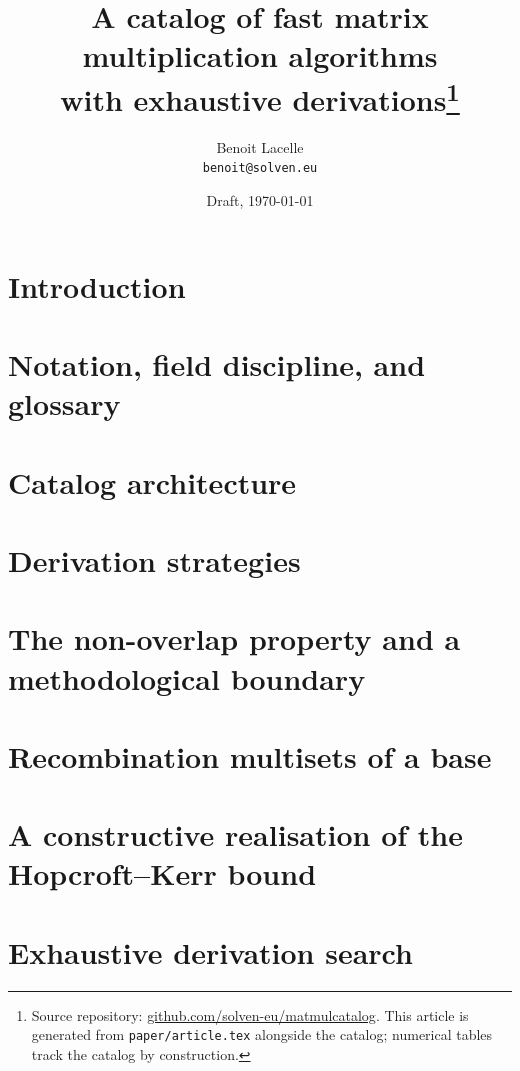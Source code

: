 \documentclass[11pt,a4paper]{article}
\title{A catalog of fast matrix multiplication algorithms\\
with exhaustive derivations\thanks{Source repository:
\href{https://github.com/solven-eu/matmulcatalog}{github.com/solven-eu/matmulcatalog}.
This article is generated from \texttt{paper/article.tex} alongside the
catalog; numerical tables track the catalog by construction.}}
\author{Benoit Lacelle\\
\texttt{benoit@solven.eu}}
\date{Draft, \today}
\begin{document}
\maketitle

\begin{abstract}

\end{abstract}

\section{Introduction}\label{sec:intro}


\section{Notation, field discipline, and glossary}\label{sec:notation}


\section{Catalog architecture}\label{sec:architecture}


\section{Derivation strategies}\label{sec:strategies}


\section{The non-overlap property and a methodological boundary}\label{sec:nonoverlap}


\section{Recombination multisets of a base}\label{sec:multisets}


\section{A constructive realisation of the Hopcroft--Kerr bound}\label{sec:hk71}


\section{Exhaustive derivation search}\label{sec:search}

\end{document}

